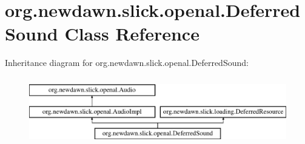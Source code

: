 \hypertarget{classorg_1_1newdawn_1_1slick_1_1openal_1_1_deferred_sound}{}\section{org.\+newdawn.\+slick.\+openal.\+Deferred\+Sound Class Reference}
\label{classorg_1_1newdawn_1_1slick_1_1openal_1_1_deferred_sound}
Inheritance diagram for org.\+newdawn.\+slick.\+openal.\+Deferred\+Sound\+:\begin{figure}[H]
\begin{center}
\leavevmode
\includegraphics[height=3.000000cm]{classorg_1_1newdawn_1_1slick_1_1openal_1_1_deferred_sound}
\end{center}
\end{figure}
